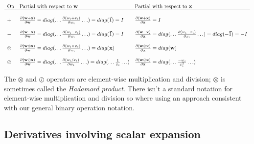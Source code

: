 \documentclass[11pt]{article}
\begin{document}
$
\begin{array}{lllll}
\text{Op} & \text{Partial with respect to } \mathbf{w} & \text{Partial with respect to }\mathbf{x}\\
\hline\\

+ & \frac{\partial (\mathbf{w+x})}{\partial \mathbf{w}} = diag(\ldots \frac{\partial (w_i + x_i)}{\partial w_i} \ldots) = diag(\vec{1}) = I & \frac{\partial (\mathbf{w+x})}{\partial \mathbf{x}} =  I\\\\

- & \frac{\partial (\mathbf{w-x})}{\partial \mathbf{w}}  =  diag(\ldots\frac{\partial (w_i - x_i)}{\partial w_i}\ldots) =  diag(\vec{1})  =  I & \frac{\partial (\mathbf{w-x})}{\partial \mathbf{x}}  =  diag(\ldots\frac{\partial (w_i - x_i)}{\partial x_i}\ldots)  =  diag(-\vec{1})  =  -I \\\\

\otimes & \frac{\partial (\mathbf{w \otimes x})}{\partial \mathbf{w}}  =  diag(\ldots\frac{\partial (w_i \times x_i)}{\partial w_i} \ldots)  =  diag(\mathbf{x}) & \frac{\partial (\mathbf{w \otimes x})}{\partial \mathbf{x}}  =  diag(\mathbf{w})\\\\

\oslash & \frac{\partial (\mathbf{w \oslash x})}{\partial \mathbf{w}}  =  diag(\ldots\frac{\partial (w_i / x_i)}{\partial w_i}\ldots)  =  diag(\ldots \frac{1}{x_i} \ldots) & \frac{\partial (\mathbf{w \oslash x})}{\partial \mathbf{x}}  =  diag(\ldots \frac{-w_i}{x_i^2} \ldots)\\

\end{array}
$

The $\otimes$ and $\oslash$ operators are element-wise multiplication and division; $\otimes$ is sometimes called the {\em Hadamard product}. There isn't a standard notation for element-wise multiplication and division so where using an approach consistent with our general binary operation notation.

\subsection{Derivatives involving scalar expansion}
\end{document}
